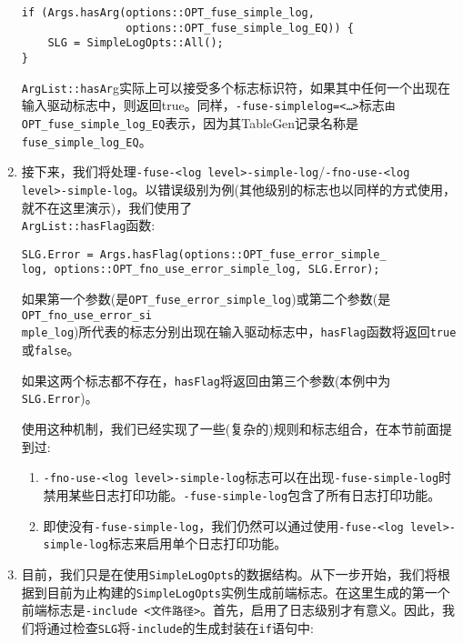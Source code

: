 \begin{enumerate}
\begin{lstlisting}[style=styleCXX]
if (Args.hasArg(options::OPT_fuse_simple_log,
                options::OPT_fuse_simple_log_EQ)) {
	SLG = SimpleLogOpts::All();
}
\end{lstlisting}

\texttt{ArgList::hasAr}g实际上可以接受多个标志标识符，如果其中任何一个出现在输入驱动标志中，则返回true。同样，\texttt{-fuse-simplelog=<…>}标志\texttt{由OPT\_fuse\_simple\_log\_EQ}表示，因为其TableGen记录名称是\texttt{fuse\_simple\_log\_EQ}。

\item 接下来，我们将处理\texttt{-fuse-<log level>-simple-log}/\texttt{-fno-use-<log level>-simple-log}。以错误级别为例(其他级别的标志也以同样的方式使用，就不在这里演示)，我们使用了\\\texttt{ArgList::hasFlag}函数:

\begin{lstlisting}[style=styleCXX]
SLG.Error = Args.hasFlag(options::OPT_fuse_error_simple_
log, options::OPT_fno_use_error_simple_log, SLG.Error);
\end{lstlisting}

如果第一个参数(是\texttt{OPT\_fuse\_error\_simple\_log})或第二个参数(是\texttt{OPT\_fno\_use\_error\_si\\mple\_log})所代表的标志分别出现在输入驱动标志中，\texttt{hasFlag}函数将返回\texttt{true}或\texttt{false}。

如果这两个标志都不存在，\texttt{hasFlag}将返回由第三个参数(本例中为\texttt{SLG.Error})。

使用这种机制，我们已经实现了一些(复杂的)规则和标志组合，在本节前面提到过:

\begin{enumerate}[label=\alph*)]
\item \texttt{-fno-use-<log level>-simple-log}标志可以在出现\texttt{-fuse-simple-log}时禁用某些日志打印功能。\texttt{-fuse-simple-log}包含了所有日志打印功能。

\item 即使没有\texttt{-fuse-simple-log}，我们仍然可以通过使用\texttt{-fuse-<log level>-simple-log}标志来启用单个日志打印功能。
\end{enumerate}

\item 目前，我们只是在使用\texttt{SimpleLogOpts}的数据结构。从下一步开始，我们将根据到目前为止构建的\texttt{SimpleLogOpts}实例生成前端标志。在这里生成的第一个前端标志是\texttt{-include <文件路径>}。首先，启用了日志级别才有意义。因此，我们将通过检查\texttt{SLG}将\texttt{-include}的生成封装在\texttt{if}语句中:


\end{enumerate}
